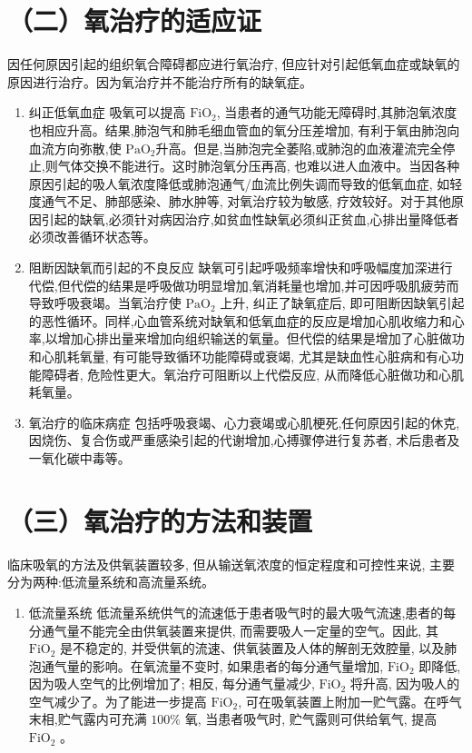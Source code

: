 \documentclass[10pt]{article}
\begin{document}
\section*{（二）氧治疗的适应证}
因任何原因引起的组织氧合障碍都应进行氧治疗, 但应针对引起低氧血症或缺氧的原因进行治疗。因为氧治疗并不能治疗所有的缺氧症。

\begin{enumerate}
  \item 纠正低氧血症 吸氧可以提高 $\mathrm{FiO}_{2}$, 当患者的通气功能无障碍时,其肺泡氧浓度也相应升高。结果,肺泡气和肺毛细血管血的氧分压差增加, 有利于氧由肺泡向血流方向弥散,使 $\mathrm{PaO}_{2}$升高。但是,当肺泡完全萎陷,或肺泡的血液灌流完全停止,则气体交换不能进行。这时肺泡氧分压再高, 也难以进人血液中。当因各种原因引起的吸人氧浓度降低或肺泡通气/血流比例失调而导致的低氧血症, 如轻度通气不足、肺部感染、肺水肿等, 对氧治疗较为敏感, 疗效较好。对于其他原因引起的缺氧,必须针对病因治疗,如贫血性缺氧必须纠正贫血,心排出量降低者必须改善循环状态等。

  \item 阻断因缺氧而引起的不良反应 缺氧可引起呼吸频率增快和呼吸幅度加深进行代偿,但代偿的结果是呼吸做功明显增加,氧消耗量也增加,并可因呼吸肌疲劳而导致呼吸衰竭。当氧治疗使 $\mathrm{PaO}_{2}$ 上升, 纠正了缺氧症后, 即可阻断因缺氧引起的恶性循环。同样,心血管系统对缺氧和低氧血症的反应是增加心肌收缩力和心率,以增加心排出量来增加向组织输送的氧量。但代偿的结果是增加了心脏做功和心肌耗氧量, 有可能导致循环功能障碍或衰竭, 尤其是缺血性心脏病和有心功能障碍者, 危险性更大。氧治疗可阻断以上代偿反应, 从而降低心脏做功和心肌耗氧量。

  \item 氧治疗的临床病症 包括呼吸衰竭、心力衰竭或心肌梗死,任何原因引起的休克,因烧伤、复合伤或严重感染引起的代谢增加,心搏骤停进行复苏者, 术后患者及一氧化碳中毒等。

\end{enumerate}

\section*{（三）氧治疗的方法和装置}
临床吸氧的方法及供氧装置较多, 但从输送氧浓度的恒定程度和可控性来说, 主要分为两种:低流量系统和高流量系统。

\begin{enumerate}
  \item 低流量系统 低流量系统供气的流速低于患者吸气时的最大吸气流速,患者的每分通气量不能完全由供氧装置来提供, 而需要吸人一定量的空气。因此, 其 $\mathrm{FiO}_{2}$ 是不稳定的, 并受供氧的流速、供氧装置及人体的解剖无效腔量, 以及肺泡通气量的影响。在氧流量不变时, 如果患者的每分通气量增加, $\mathrm{FiO}_{2}$ 即降低, 因为吸人空气的比例增加了; 相反, 每分通气量减少, $\mathrm{FiO}_{2}$ 将升高, 因为吸人的空气减少了。为了能进一步提高 $\mathrm{FiO}_{2}$, 可在吸氧装置上附加一贮气露。在呼气末相,贮气露内可充满 $100 \%$ 氧, 当患者吸气时, 贮气露则可供给氧气, 提高 $\mathrm{FiO}_{2}$ 。
\end{enumerate}
\end{document}
